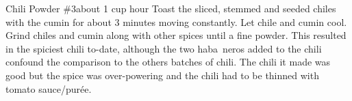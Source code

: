 \begin{recipe}{Chili Powder \#3}{about 1 cup}{ hour}
Toast the sliced, stemmed and seeded chiles with the cumin for about 3 minutes moving constantly.  Let chile and cumin cool.
Grind chiles and cumin along with other spices until a fine powder.
\freeform This resulted in the spiciest chili to-date, although the two haba~{n}eros added to the chili confound the comparison to the others batches of chili.  The chili it made was good but the spice was over-powering and the chili had to be thinned with tomato sauce/pur\'{e}e.
\end{recipe}
